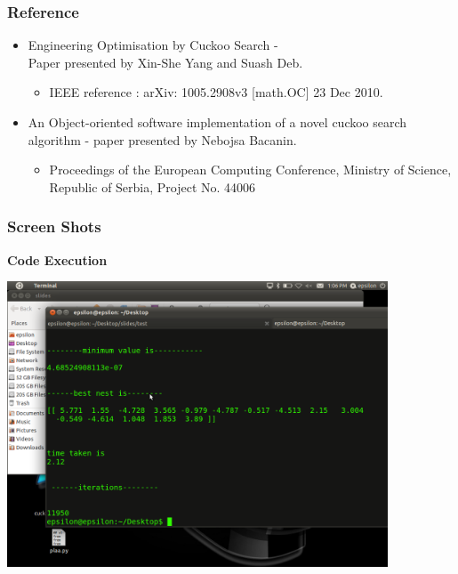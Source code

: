 \documentclass[10pt]{beamer}
\begin{document}
\begin{frame}
  \frametitle{Reference}
  \begin{itemize}
  	\item Engineering Optimisation by Cuckoo Search - \\
  	Paper presented by Xin-She Yang and Suash Deb.
  	\begin{itemize}
  	\item IEEE reference : arXiv: 1005.2908v3 [math.OC] 23 Dec 2010.
  	\end{itemize}
  	\item An Object-oriented software implementation of a novel cuckoo search algorithm - paper presented by Nebojsa Bacanin.
  	\begin{itemize}
  	\item Proceedings of the European Computing Conference, Ministry of Science, Republic of Serbia, Project No. 44006
  	\end{itemize}
	\end{itemize}	  
\end{frame}

\begin{frame}
	\frametitle{Screen Shots}
	\textbf{Code Execution}
	\begin{center}
	\includegraphics[width=0.85\textwidth]{abc.png}
	\end{center}
\end{frame}
\end{document}
